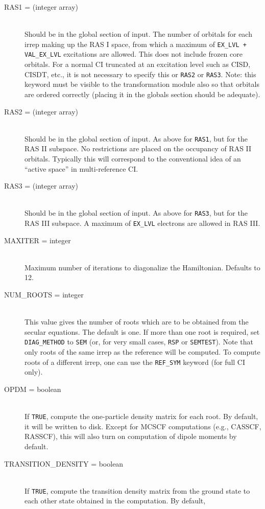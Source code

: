 \begin{description}
\item[RAS1 = (integer array)]\mbox{}\\
Should be in the global section of input.
The number of orbitals for each irrep making up the RAS I space,
from which a maximum of {\tt EX\_LVL + VAL\_EX\_LVL} excitations
are allowed.
This does not include frozen core orbitals.  For a normal
CI truncated at an excitation level such as CISD, CISDT, etc., it is
not necessary to specify this or {\tt RAS2} or {\tt RAS3}.
Note: this keyword must be visible to the transformation module
also so that orbitals are ordered correctly (placing it in 
the globals section should be adequate).
\item[RAS2 = (integer array)]\mbox{}\\
Should be in the global section of input.
As above for {\tt RAS1}, but for the RAS II subspace.  
No restrictions are placed on the occupancy of RAS II orbitals.
Typically this will correspond to the conventional idea of
an ``active space'' in multi-reference CI.
\item[RAS3 = (integer array)]\mbox{}\\
Should be in the global section of input.
As above for {\tt RAS3}, but for the RAS III subspace.
A maximum of {\tt EX\_LVL} electrons are allowed in RAS III.
\item[MAXITER = integer]\mbox{}\\
Maximum number of iterations to diagonalize the Hamiltonian.
Defaults to 12.
\item[NUM\_ROOTS = integer]\mbox{}\\
This value gives the number of roots which are to be obtained from
the secular equations.  The default is one.  If more than one root
is required, set {\tt DIAG\_METHOD} to {\tt SEM} (or, for very small cases,
{\tt RSP} or {\tt SEMTEST}).  Note that only roots of the same
irrep as the reference will be computed.  To compute roots of a different
irrep, one can use the {\tt REF\_SYM} keyword (for full CI only).
\item[OPDM = boolean]\mbox{}\\
If {\tt TRUE}, compute the one-particle density matrix for each root.  
By default, it will be written to disk.  Except for 
MCSCF computations (e.g., CASSCF, RASSCF), this will also turn on computation
of dipole moments by default.
\item[TRANSITION\_DENSITY = boolean]\mbox{}\\
If {\tt TRUE}, compute the transition density matrix from the ground
state to each other state obtained in the computation.  By default,

\end{description}
